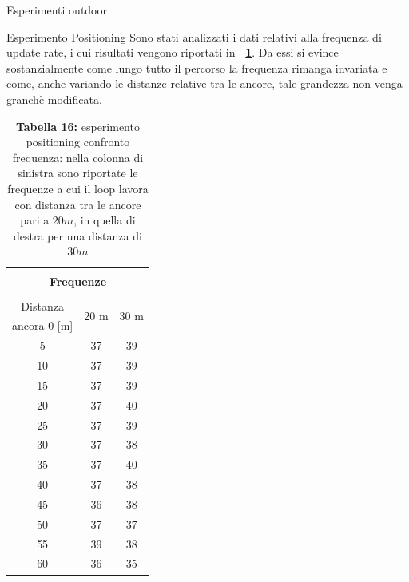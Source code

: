 \documentclass[12pt]{report}
\begin{document}
\begin{section}{Esperimenti outdoor}
\begin{subsection}{Esperimento Positioning}
			Sono stati analizzati i dati relativi alla frequenza di update rate, i cui risultati vengono riportati in \textbf{\tablename~\ref{EspOutFreq}}. Da essi si evince sostanzialmente come lungo tutto il percorso la frequenza rimanga invariata e come, anche variando le distanze relative tra le ancore, tale grandezza non 						venga granchè modificata.
			\begin{table}[H]
					\centering
					\begin{tabular}{|c|c||c|}
						\hline
						\multicolumn{3}{|c|}{}\\
						\multicolumn{3}{|c|}{\textbf{\Large Frequenze}}\\
						\multicolumn{3}{|c|}{}\\
						\hline
						Distanza&			\multirow{2}{*}{20 m}&  \multirow{2}{*}{30 m}\\
						ancora 0 [m]&&\\
						\hline
   						5&		    							37&		    39\\
						\hline
    					10&										37&    		39\\
						\hline
    					15&										37&		    39\\
						\hline
   						20&										37&    		40\\
						\hline
    					25&										37&    		39\\
						\hline
    					30&										37&    		38\\
						\hline
    					35&										37&    		40\\
						\hline
    					40&										37&    		38\\
						\hline
    					45&										36&    		38\\
						\hline
    					50&										37&    		37\\
						\hline
    					55&										39&    		38\\
						\hline
    					60&										36&    		35\\
						\hline
					\end{tabular}
					\caption{\textbf{Tabella 16:} esperimento positioning confronto frequenza: nella colonna di sinistra sono riportate le frequenze a cui il loop lavora con distanza tra le ancore pari a $20 m$, in quella di destra per una distanza di $30m$ \label{EspOutFreq}}
				\end{table}


\end{subsection}
\end{section}
\end{document}
